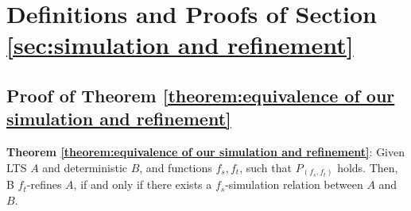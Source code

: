 















\section{Definitions and Proofs of Section \ref{sec:simulation and refinement}}
\label{sec:appendix definitions and proofs of section simulation and refinement}




\subsection{Proof of Theorem \ref{theorem:equivalence of our simulation and refinement}}
\label{subsec:proof of theorem equivalence of our simulation and refinement}


{\noindent \bf Theorem \ref{theorem:equivalence of our simulation and refinement}}: Given LTS $A$ and deterministic $B$, and functions $f_s,f_t$, such that $P_{(f_s,f_t)}$ holds. Then, B $f_t$-refines $A$, if and only if there exists a $f_s$-simulation relation between $A$ and $B$.

